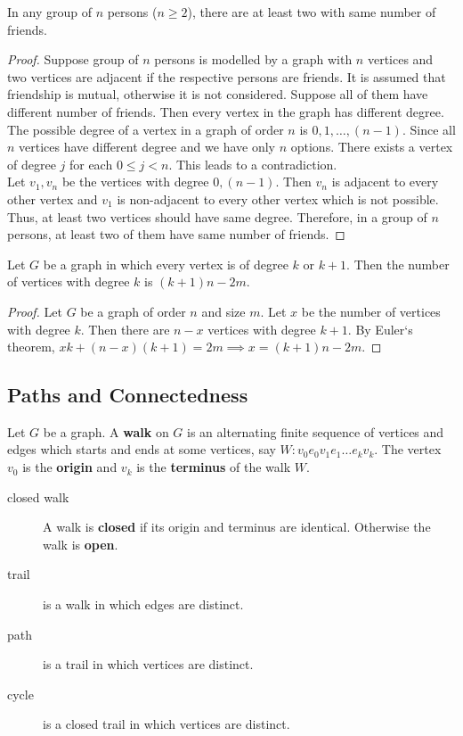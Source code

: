 \begin{application}
	In any group of $n$ persons ($n \ge 2$), there are at least two with same number of friends.
\end{application}
\begin{proof}
	Suppose group of $n$ persons is modelled by a graph with $n$ vertices and two vertices are adjacent if the respective persons are friends. It is assumed that friendship is mutual, otherwise it is not considered. Suppose all of them have different number of friends. Then every vertex in the graph has different degree.\\

	The possible degree of a vertex in a graph of order $n$ is $0,1,\dots,(n-1)$. Since all $n$ vertices have different degree and we have only $n$ options. There exists a vertex of degree $j$ for each $0 \le j < n$. This leads to a contradiction.\\

	Let $v_1,v_n$ be the vertices with degree $0,(n-1)$. Then $v_n$ is adjacent to every other vertex and $v_1$ is non-adjacent to every other vertex which is not possible. Thus, at least two vertices should have same degree. Therefore, in a group of $n$ persons, at least two of them have same number of friends.
\end{proof}

\begin{exercise}
	Let $G$ be a graph in which every vertex is of degree $k$ or $k+1$. Then the number of vertices with degree $k$ is $(k+1)n-2m$.
\end{exercise}
\begin{proof}
	Let $G$ be a graph of order $n$ and size $m$.
	Let $x$ be the number of vertices with degree $k$.
	Then there are $n-x$ vertices with degree $k+1$.
	By Euler`s theorem, $ xk + (n-x)(k+1) = 2m \implies x = (k+1)n-2m$.
\end{proof}
	
\subsection{Paths and Connectedness}
\begin{definition}
	Let $G$ be a graph. A \textbf{walk} on $G$ is an alternating finite sequence of vertices and edges which starts and ends at some vertices, say $W : v_0 e_0 v_1 e_1 \dots e_k v_k$.
	The vertex $v_0$ is the \textbf{origin} and $v_k$ is the \textbf{terminus} of the walk $W$.
\end{definition}
\begin{description}
	\item[closed walk] A walk is \textbf{closed} if its origin and terminus are identical. Otherwise the walk is \textbf{open}.
	\item[trail] is a walk in which edges are distinct.
	\item[path] is a trail in which vertices are distinct.
	\item[cycle] is a closed trail in which vertices are distinct.
\end{description}

